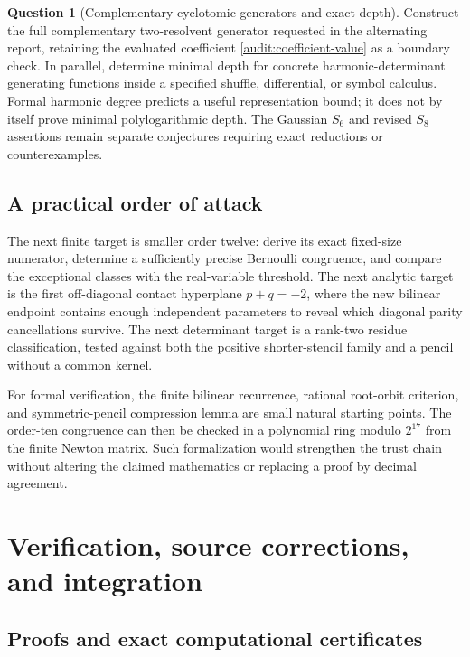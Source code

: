 \documentclass[11pt]{article}
\theoremstyle{definition}
\newtheorem{question}{Question}
\theoremstyle{remark}
\numberwithin{equation}{section}
\begin{document}
\begin{question}[Complementary cyclotomic generators and exact depth]
Construct the full complementary two-resolvent generator requested
in the alternating report, retaining the evaluated coefficient
\eqref{audit:coefficient-value} as a boundary check. In parallel,
determine minimal depth for concrete harmonic-determinant generating
functions inside a specified shuffle, differential, or symbol
calculus. Formal harmonic degree predicts a useful representation
bound; it does not by itself prove minimal polylogarithmic depth.
The Gaussian $S_6$ and revised $S_8$ assertions remain separate
conjectures requiring exact reductions or counterexamples.
\end{question}

\subsection{A practical order of attack}

The next finite target is smaller order twelve: derive its exact
fixed-size numerator, determine a sufficiently precise Bernoulli
congruence, and compare the exceptional classes with the real-variable
threshold. The next analytic target is the first off-diagonal contact
hyperplane $p+q=-2$, where the new bilinear endpoint contains enough
independent parameters to reveal which diagonal parity cancellations
survive. The next determinant target is a rank-two residue
classification, tested against both the positive shorter-stencil
family and a pencil without a common kernel.

For formal verification, the finite bilinear recurrence, rational
root-orbit criterion, and symmetric-pencil compression lemma are
small natural starting points. The order-ten congruence can then be
checked in a polynomial ring modulo $2^{17}$ from the finite Newton
matrix. Such formalization would strengthen the trust chain without
altering the claimed mathematics or replacing a proof by decimal
agreement.


\section{Verification, source corrections, and integration}
\label{verification:sec}

\subsection{Proofs and exact computational certificates}
\end{document}
